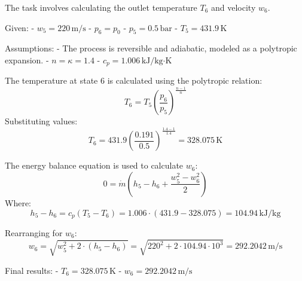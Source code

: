 The task involves calculating the outlet temperature \( T_6 \) and velocity \( w_6 \).  

Given:  
- \( w_5 = 220 \, \text{m/s} \)  
- \( p_6 = p_0 \)  
- \( p_5 = 0.5 \, \text{bar} \)  
- \( T_5 = 431.9 \, \text{K} \)  

Assumptions:  
- The process is reversible and adiabatic, modeled as a polytropic expansion.  
- \( n = \kappa = 1.4 \)  
- \( c_p = 1.006 \, \text{kJ}/\text{kg·K} \)  

The temperature at state 6 is calculated using the polytropic relation:  
\[
T_6 = T_5 \left( \frac{p_6}{p_5} \right)^{\frac{n-1}{n}}
\]  
Substituting values:  
\[
T_6 = 431.9 \left( \frac{0.191}{0.5} \right)^{\frac{1.4-1}{1.4}} = 328.075 \, \text{K}
\]  

The energy balance equation is used to calculate \( w_6 \):  
\[
0 = \dot{m} \left( h_5 - h_6 + \frac{w_5^2 - w_6^2}{2} \right)
\]  
Where:  
\[
h_5 - h_6 = c_p (T_5 - T_6) = 1.006 \cdot (431.9 - 328.075) = 104.94 \, \text{kJ/kg}
\]  

Rearranging for \( w_6 \):  
\[
w_6 = \sqrt{w_5^2 + 2 \cdot (h_5 - h_6)} = \sqrt{220^2 + 2 \cdot 104.94 \cdot 10^3} = 292.2042 \, \text{m/s}
\]  

Final results:  
- \( T_6 = 328.075 \, \text{K} \)  
- \( w_6 = 292.2042 \, \text{m/s} \)